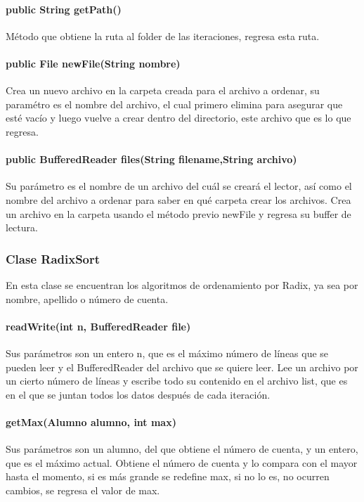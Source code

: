 \documentclass[11pt]{article}
\begin{document}
\paragraph{public String getPath()}
Método que obtiene la ruta al folder de las iteraciones, regresa esta ruta. 

\paragraph{public File newFile(String nombre)}
Crea un nuevo archivo en la carpeta creada para el archivo a ordenar, su paramétro es el nombre del archivo, el cual primero elimina para asegurar que esté vacío y luego vuelve a crear dentro del directorio, este archivo que es lo que regresa. 

\paragraph{public BufferedReader files(String filename,String archivo) }
Su parámetro es el nombre de un archivo del cuál se creará el lector, así como el nombre del archivo a ordenar para saber en qué carpeta crear los archivos. Crea un archivo en la carpeta usando el método previo newFile y regresa su buffer de lectura.  

\subsubsection{Clase RadixSort}
En esta clase se encuentran los algoritmos de ordenamiento por Radix, ya sea por nombre, apellido o número de cuenta. 

\paragraph{readWrite(int n, BufferedReader file)} 
Sus parámetros son un entero n, que es el máximo número de líneas que se pueden leer y el BufferedReader del archivo que se quiere leer. Lee un archivo por un cierto número de líneas y escribe todo su contenido en el archivo list, que es en el que se juntan todos los datos después de cada iteración.

\paragraph{getMax(Alumno alumno, int max)}
Sus parámetros son un alumno, del que obtiene el número de cuenta, y un entero, que es el máximo actual. Obtiene el número de cuenta y lo compara con el mayor hasta el momento, si es más grande se redefine max, si no lo es, no ocurren cambios, se regresa el valor de max. 
\end{document}
